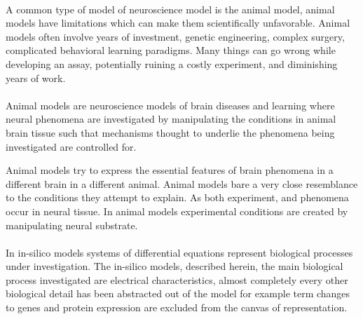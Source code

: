 \\ 
A common type of model of neuroscience model is the animal model, animal models have limitations which can make them scientifically unfavorable. Animal models often involve years of investment, genetic engineering, complex surgery, complicated behavioral learning paradigms. Many things can go wrong while developing an assay, potentially ruining a costly experiment, and diminishing years of work.\\
\\
Animal models are neuroscience models of brain diseases and learning where neural phenomena are investigated by manipulating the conditions in animal brain tissue such that mechanisms thought to underlie the phenomena being investigated are controlled for. 

Animal models try to express the essential features of brain phenomena in a different brain in a different animal. Animal models bare a very close resemblance to the conditions they attempt to explain. As both experiment, and phenomena occur in neural tissue. In animal models experimental conditions are created by manipulating neural substrate.\\  
\\
In in-silico models systems of differential equations represent biological processes under investigation. The in-silico models, described herein, the main biological process investigated are electrical characteristics, almost completely every other biological detail has been abstracted out of the model for example term changes to genes and protein expression are excluded from the canvas of representation.\\


